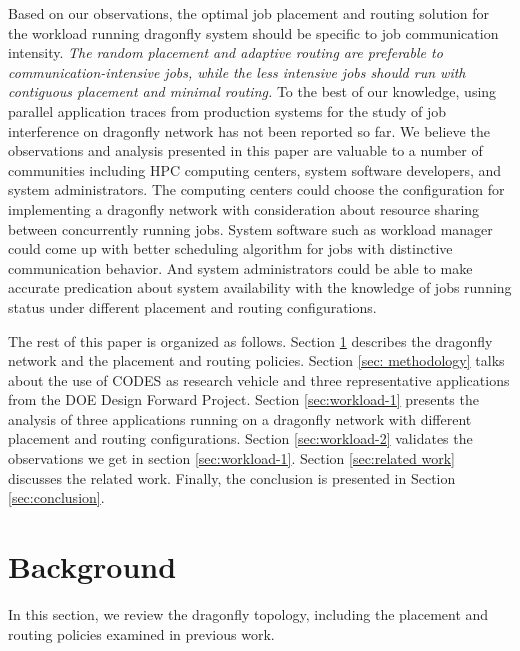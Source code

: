 \documentclass[conference,compsoc]{IEEEtran}
\begin{document}
Based on our observations, the optimal job placement and routing solution for the workload running dragonfly system should be specific to job communication intensity. \emph{The random placement and adaptive routing are preferable to communication-intensive jobs, while the less intensive jobs should run with contiguous placement and minimal routing.} To the best of our knowledge, using parallel application traces from production systems for the study of job interference on dragonfly network has not been reported so far. We believe the observations and analysis presented in this paper are valuable to a number of communities including HPC computing centers, system software developers, and system administrators. The computing centers could choose the configuration for implementing a dragonfly network with consideration about resource sharing between concurrently running jobs. System software such as workload manager could come up with better scheduling algorithm for jobs with distinctive communication behavior. And system administrators could be able to make accurate predication about system availability with the knowledge of jobs running status under different placement and routing configurations.

The rest of this paper is organized as follows. Section \ref{sec:background} describes the dragonfly network and the placement and routing policies. Section \ref{sec: methodology} talks about the use of CODES as research vehicle and three representative applications from the DOE Design Forward Project. Section \ref{sec:workload-1} presents the analysis of three applications running on a dragonfly network with different placement and routing configurations. Section \ref{sec:workload-2} validates the observations we get in section \ref{sec:workload-1}. Section \ref{sec:related work} discusses the related work. Finally, the conclusion is presented in Section \ref{sec:conclusion}.

\section{Background}
\label{sec:background}

In this section, we review the dragonfly topology, including the placement and routing policies examined in previous work. 
\end{document}
